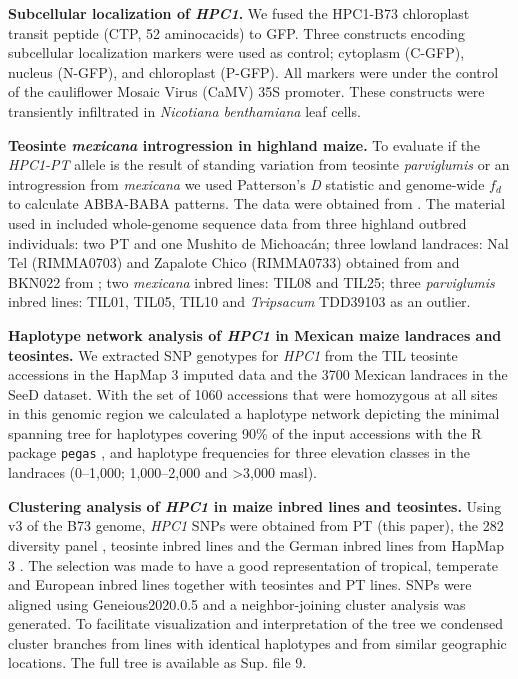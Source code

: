 \documentclass[9pt,twocolumn,twoside,lineno]{biorxiv}
\def\code#1{\texttt{#1}}
\newcommand{\mex}{\textit{mexicana}\xspace}
\newcommand{\hpc}{\textit{HPC1}\xspace}
\newcommand{\parv}{\textit{parviglumis}\xspace}
\begin{document}
\textbf{Subcellular localization of \hpc.}
We fused the HPC1-B73 chloroplast transit peptide (CTP, 52 aminocacids) to GFP. 
Three constructs encoding subcellular localization markers were used as control; cytoplasm (C-GFP), nucleus (N-GFP), and chloroplast (P-GFP).
All markers were under the control of the cauliflower Mosaic Virus (CaMV) 35S promoter. 
These constructs were transiently infiltrated in \textit{Nicotiana benthamiana} leaf cells.

\textbf{Teosinte \mex introgression in highland maize.}
To evaluate if the \textit{HPC1-PT} allele is the result of standing variation from teosinte \parv or an introgression from \mex we used Patterson's \textit{D} \cite{Patterson2012-sw} statistic and genome-wide $f_{d}$ \cite{Martin2015-ee} to calculate ABBA-BABA patterns. 
The data were obtained from \cite{Gonzalez-Segovia2019-jy}. 
The material used in \cite{Gonzalez-Segovia2019-jy} included whole-genome sequence data from three highland outbred individuals: two PT and one Mushito de Michoacán; three lowland landraces: Nal Tel (RIMMA0703) and Zapalote Chico (RIMMA0733) obtained from \cite{Wang2017-bc} and  BKN022 from \cite{Bukowski2017-ng}; two \mex inbred lines: TIL08 and TIL25; three \parv inbred lines: TIL01, TIL05, TIL10 and \textit{Tripsacum} TDD39103 \cite{Bukowski2017-ng} as an outlier. 

\textbf{Haplotype network analysis of \hpc in Mexican maize landraces and teosintes.}
We extracted SNP genotypes for \hpc from the TIL teosinte accessions in the HapMap 3 imputed data \cite{Bukowski2017-ng} and the 3700 Mexican landraces in the SeeD dataset. 
With the set of 1060 accessions that were homozygous at all sites in this genomic region we calculated a haplotype network depicting the minimal spanning tree for haplotypes covering 90\% of the input accessions with the R package \code{pegas} \cite{paradis2010}, and haplotype frequencies for three elevation classes in the landraces (0--1,000; 1,000--2,000 and >3,000 masl).

\textbf{Clustering analysis of \hpc in maize inbred lines and teosintes.}
Using v3 of the B73 genome, \hpc SNPs were obtained from PT (this paper), the 282 diversity panel \cite{Flint-Garcia2005-hb}, teosinte inbred lines and the German inbred lines from HapMap 3 \cite{Bukowski2017-ng}. 
The selection was made to have a good representation of tropical, temperate and European inbred lines together with teosintes and PT lines.
SNPs were aligned using Geneious2020.0.5 and a neighbor-joining cluster analysis was generated. 
To facilitate visualization and interpretation of the tree we condensed cluster branches from lines with identical haplotypes and from similar geographic locations. 
The full tree is available as Sup. file 9. 
\end{document}
